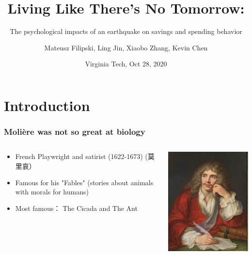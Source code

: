 \documentclass[aspectratio=169]{beamer}
\title[Living Like There's No Tomorrow]{Living Like There's No Tomorrow:}
\subtitle{The psychological impacts of an earthquake on savings and spending behavior}
\author{Mateusz Filipski, Ling Jin, Xiaobo Zhang, Kevin Chen}
\institute{UGA, Huazhong Agricultural U., Beijing U., Zhejiang U., IFPRI}
\date{Virginia Tech, Oct 28, 2020}
\begin{document}
\frame{\titlepage}

\section*{Introduction}
\begin{frame}[label=top]
    \frametitle{\Large{Molière was not so great at biology}}
    \begin{columns}
    \begin{column}{0.5\textwidth}
        \begin{itemize}
            \item French Playwright and satirist (1622-1673) (莫里哀）
            \item Famous for his "Fables" (stories about animals with morals for humans)
            \item Most famous： 
            The Cicada and The Ant
        \end{itemize}
    \end{column}
    \begin{column}{0.5\textwidth}  %
    \begin{center}
    \includegraphics[scale=0.55]{pics/moliere.png}     \end{center}
\end{column}
\end{columns}
\end{frame}  
\end{document}
